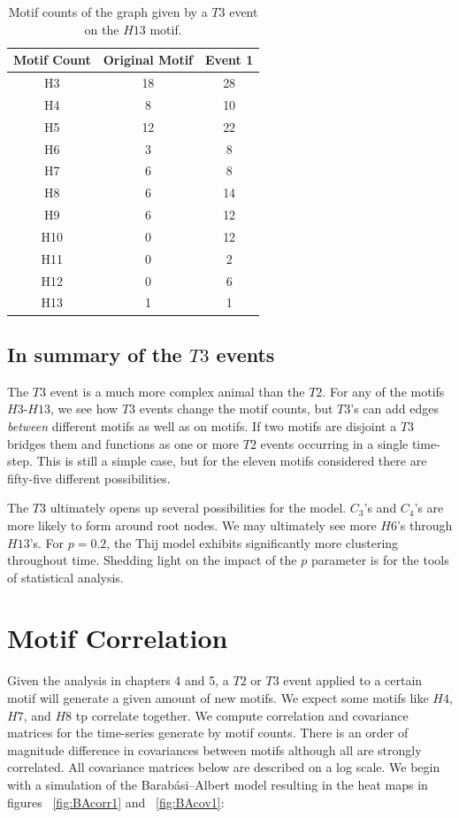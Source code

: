 \begin{table}
    \centering
    \begin{tabular}{||c c c||} 
    \hline
    Motif Count & Original Motif & Event 1\\ [0.5ex] 
    \hline\hline
    H3 & 18 & 28 \\ 
    \hline
    H4 & 8 & 10 \\
    \hline
    H5 & 12 & 22 \\
    \hline
    H6 & 3 & 8 \\
    \hline
    H7 & 6 & 8 \\
    \hline
    H8 & 6 & 14 \\
    \hline
    H9 & 6 & 12 \\
    \hline
    H10 & 0 & 12 \\
    \hline
    H11 & 0 & 2 \\
    \hline
    H12 & 0 & 6 \\
    \hline
    H13 & 1 & 1\\
    \hline
   \end{tabular}
   \caption{Motif counts of the graph given by a $T3$ event on the $H13$ motif.}
   \label{table:22}
\end{table}


\section{In summary of the $T3$ events}

The $T3$ event is a much more complex animal than the $T2$. For any of the motifs $H3$-$H13$,
 we see how $T3$ events change the motif counts, but 
$T3$'s can add edges \textit{between} different motifs as well as on motifs. If two motifs
are disjoint a $T3$ bridges them and functions as one or more $T2$ events occurring in a single 
time-step. This is still a simple case, but for the eleven motifs considered there are 
fifty-five different possibilities. 

The $T3$ ultimately opens up several possibilities for the model. $C_3$'s and $C_4$'s
are more likely to form around root nodes. We may ultimately see more 
$H6$'s through $H13$'s. For $p=0.2$, the
 Thij model exhibits significantly more clustering throughout time. Shedding light on the impact of the $p$
parameter is for the tools of statistical analysis.


\chapter{Motif Correlation}
Given the analysis in chapters 4 and 5, a $T2$ or $T3$ event applied to a certain motif will generate a given amount of
new motifs. We expect some motifs like $H4$, $H7$, and $H8$ tp correlate together. We
 compute correlation and covariance matrices for the time-series generate by motif counts. There is an order of magnitude difference in covariances between
motifs although all are strongly correlated. All covariance matrices below are described on a log scale.
 We begin with a simulation of the Barabási–Albert model
resulting in the heat maps in figures ~\ref{fig:BAcorr1} and ~\ref{fig:BAcov1}:



